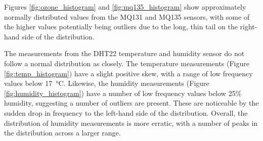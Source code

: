 \documentclass[11pt]{report}
\begin{document}
Figures \ref{fig:ozone_histogram} and \ref{fig:mq135_histogram} show approximately normally distributed values from the MQ131 and MQ135 sensors, with some of the higher values potentially being outliers due to the long, thin tail on the right-hand side of the distribution.

The measurements from the DHT22 temperature and humidity sensor do not follow a normal distribution as closely. The temperature measurements (Figure \ref{fig:temp_histogram}) have a slight positive skew, with a range of low frequency values below \SI{17}{\celsius}. Likewise, the humidity measurements (Figure \ref{fig:humidity_histogram}) have a number of low frequency values below 25\% humidity, suggesting a number of outliers are present. These are noticeable by the sudden drop in frequency to the left-hand side of the distribution. Overall, the distribution of humidity measurements is more erratic, with a number of peaks in the distribution across a larger range.
\end{document}
